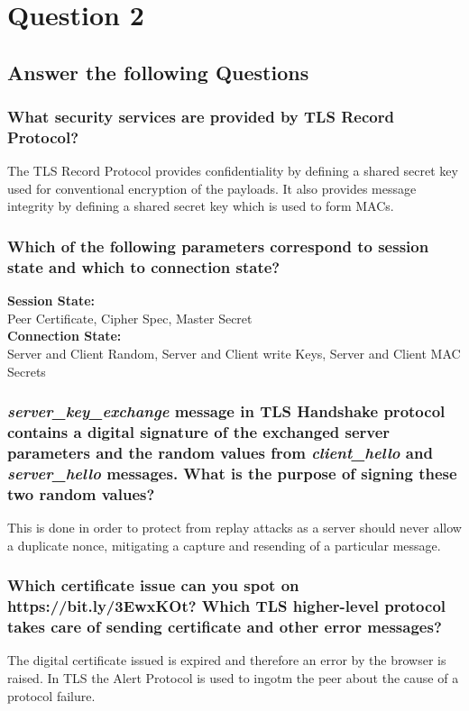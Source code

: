 \documentclass{report}
\begin{document}
	\section{Question 2}
	\startsection
		\renewcommand{\thesubsection}{\thesection.\Alph{subsection}}
		\subsection{Answer the following Questions}
		\startsubsection
			\subsubsection{What security services are provided by TLS Record Protocol?}
			\startsubsection
				The TLS Record Protocol provides confidentiality by defining a shared secret key used for conventional encryption of the payloads. It also provides message integrity by defining a shared secret key which is used to form MACs.
			\closesection
			\subsubsection{Which of the following parameters correspond to session state and which to connection state?}
			\startsubsection
				\textbf{Session State:} \\
				Peer Certificate, Cipher Spec, Master Secret \\
				\textbf{Connection State:} \\
				Server and Client Random, Server and Client write Keys, Server and Client MAC Secrets
			\closesection
			\subsubsection{\textit{server\_key\_exchange} message in TLS Handshake protocol contains a digital signature of the exchanged server parameters and the random values from \textit{client\_hello} and \textit{server\_hello} messages. What is the purpose of signing these two random values?}
			\startsubsection
				This is done in order to protect from replay attacks as a server should never allow a duplicate nonce, mitigating a capture and resending of a particular message.
			\closesection
			\subsubsection{Which certificate issue can you spot on https://bit.ly/3EwxKOt? Which TLS higher-level protocol takes care of sending certificate and other error messages?}
			\startsubsection
				The digital certificate issued is expired and therefore an error by the browser is raised. In TLS the Alert Protocol is used to ingotm the peer about the cause of a protocol failure.
			\closesection
		\closesection
		
\end{document}
